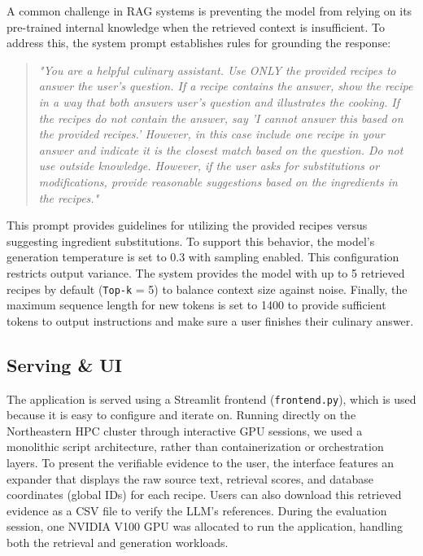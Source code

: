\documentclass[paper=a4, fontsize=11pt]{scrartcl} %
\begin{document}
A common challenge in RAG systems is preventing the model from relying on its pre-trained internal knowledge when the retrieved context is insufficient. To address this, the system prompt establishes rules for grounding the response:

\begin{quote}
\textit{"You are a helpful culinary assistant. Use ONLY the provided recipes to answer the user's question. If a recipe contains the answer, show the recipe in a way that both answers user's question and illustrates the cooking. If the recipes do not contain the answer, say 'I cannot answer this based on the provided recipes.' However, in this case include one recipe in your answer and indicate it is the closest match based on the question. Do not use outside knowledge. However, if the user asks for substitutions or modifications, provide reasonable suggestions based on the ingredients in the recipes."}
\end{quote}

This prompt provides guidelines for utilizing the provided recipes versus suggesting ingredient substitutions. To support this behavior, the model's generation temperature is set to 0.3 with sampling enabled. This configuration restricts output variance. The system provides the model with up to 5 retrieved recipes by default (\texttt{Top-k} = 5) to balance context size against noise. Finally, the maximum sequence length for new tokens is set to 1400 to provide sufficient tokens to output instructions and make sure a user finishes their culinary answer.

\subsection{Serving \& UI}
The application is served using a Streamlit frontend (\texttt{frontend.py}), which is used because it is easy to configure and iterate on. Running directly on the Northeastern HPC cluster through interactive GPU sessions, we used a monolithic script architecture, rather than containerization or orchestration layers. 
To present the verifiable evidence to the user, the interface features an expander that displays the raw source text, retrieval scores, and database coordinates (global IDs) for each recipe. Users can also download this retrieved evidence as a CSV file to verify the LLM's references.
During the evaluation session, one NVIDIA V100 GPU was allocated to run the application, handling both the retrieval and generation workloads.
\end{document}
